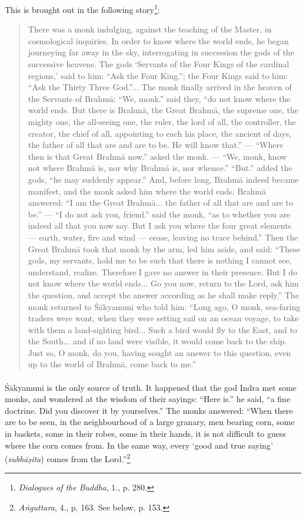 \documentclass[a4paper, 11pt, oneside, english, landscape]{article}
\begin{document}
This is brought out in the following story\footnote{\emph{Dialogues of the Buddha}, 1., p. 280.}:
\begin{quotation}
\small
There was a monk indulging, against the teaching of the Master, in cosmological inquiries. In order to know where the world ends, he began journeying far away in the sky, interrogating in succession the gods of the successive heavens. The gods `Servants of the Four Kings of the cardinal regions,' said to him: ``Ask the Four King.''; the Four Kings said to him: ``Ask the Thirty Three God.''... The monk finally arrived in the heaven of the Servants of Brahmā: ``We, monk.'' said they, ``do not know where the world ends. But there is Brahmā, the Great Brahmā, the supreme one, the mighty one, the all-seeing one, the ruler, the lord of all, the controller, the creator, the chief of all, appointing to each his place, the ancient of days, the father of all that are and are to be. He will know that.'' --- ``Where then is that Great Brahmā now.'' asked the monk. --- ``We, monk, know not where Brahmā is, nor why Brahmā is, nor whence.'' ``But.'' added the gods, ``he may suddenly appear.'' And, before long, Brahmā indeed became manifest, and the monk asked him where the world ends. Brahmā answered: ``I am the Great Brahmā... the father of all that are and are to be.'' --- ``I do not ask you, friend.'' said the monk, ``as to whether you are indeed all that you now say. But I ask you where the four great elements --- earth, water, fire and wind --- cease, leaving no trace behind.'' Then the Great Brahmā took that monk by the arm, led him aside, and said: ``These gods, my servants, hold me to be such that there is nothing I cannot see, understand, realize. Therefore I gave no answer in their presence. But I do not know where the world ends... Go you now, return to the Lord, ask him the question, and accept the answer according as he shall make reply.'' The monk returned to Śākyamuni who told him: ``Long ago, O monk, sea-faring traders were wont, when they were setting sail on an ocean voyage, to take with them a land-sighting bird... Such a bird would fly to the East, and to the South... and if no land were visible, it would come back to the ship. Just so, O monk, do you, having sought an answer to this question, even up to the world of Brahmā, come back to me.''
\end{quotation}
\paragraph{}
Śākyamuni is the only source of truth. It happened that the god Indra met some monks, and wondered at the wisdom of their sayings: ``Here is.'' he said, ``a fine doctrine. Did you discover it by yourselves.'' The monks answered: ``When there are to be seen, in the neighbourhood of a large granary, men bearing corn, some in baskets, some in their robes, some in their hands, it is not difficult to guess where the corn comes from. In the same way, every `good and true saying' (\emph{subhāṣita}) comes from the Lord.''\footnote{\emph{Aṅguttara}, 4., p. 163. See below, p. 153.}
\clearpage
\end{document}
